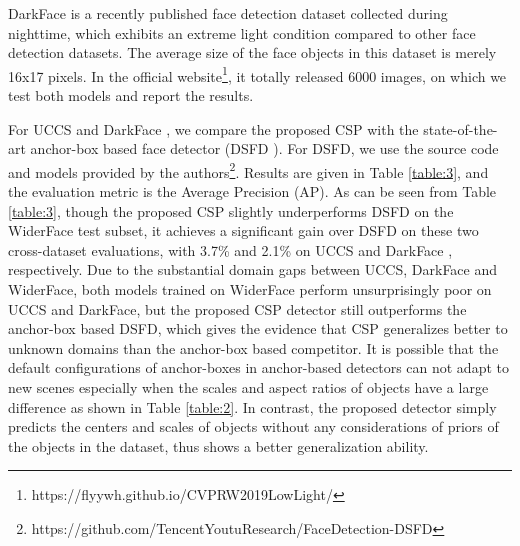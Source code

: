 \documentclass[review]{elsarticle}
\begin{document}
DarkFace \cite{wei2018deep} is a recently published face detection dataset collected during nighttime, which exhibits an extreme light condition compared to other face detection datasets. The average size of the face objects in this dataset is merely 16x17 pixels. In the official website\footnote{https://flyywh.github.io/CVPRW2019LowLight/}, it totally released 6000 images, on which we test both models and report the results.

For UCCS \cite{uccs} and DarkFace \cite{wei2018deep}, we compare the proposed CSP with the state-of-the-art anchor-box based face detector (DSFD \cite{li2018dsfd}). For DSFD, we use the source code and models provided by the authors\footnote{https://github.com/TencentYoutuResearch/FaceDetection-DSFD}.
Results are given in Table \ref{table:3}, and the evaluation metric is the Average Precision (AP). As can be seen from Table \ref{table:3}, though the proposed CSP slightly underperforms DSFD on the WiderFace test subset, it achieves a significant gain over DSFD on these two cross-dataset evaluations, with 3.7\% and 2.1\% on UCCS \cite{uccs} and DarkFace \cite{wei2018deep}, respectively. Due to the substantial domain gaps between UCCS, DarkFace and WiderFace, both models trained on WiderFace perform unsurprisingly poor on UCCS and DarkFace, but the proposed CSP detector still outperforms the anchor-box based DSFD, which gives the evidence that CSP generalizes better to unknown domains than the anchor-box based competitor. It is possible that the default configurations of anchor-boxes in anchor-based detectors can not adapt to new scenes especially when the scales and aspect ratios of objects have a large difference as shown in Table \ref{table:2}. In contrast, the proposed detector simply predicts the centers and scales of objects without any considerations of priors of the objects in the dataset, thus shows a better generalization ability.

\begin{table}
\begin{center}
\end{center}
\caption{Comparisons on generalization ability of face detectors (Evaluation metric: Average Precision (AP); the higher, the better).}
\label{table:3}

\end{table}
\end{document}
